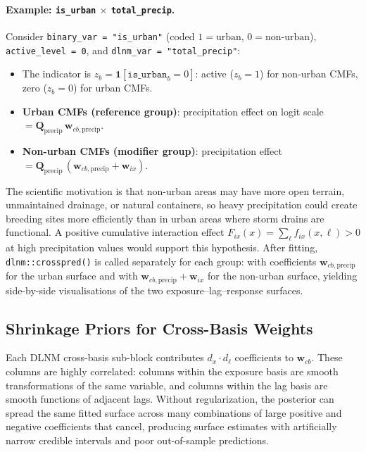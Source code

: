 \documentclass[12pt,a4paper]{article}
\begin{document}
\paragraph{Example: \texttt{is\_urban} $\times$ \texttt{total\_precip}.}
Consider \texttt{binary\_var = "is\_urban"} (coded $1 = \text{urban}$, $0 = \text{non-urban}$), \texttt{active\_level = 0}, and \texttt{dlnm\_var = "total\_precip"}:
\begin{itemize}
  \item The indicator is $z_b = \mathbf{1}[\texttt{is\_urban}_b = 0]$: active ($z_b = 1$) for non-urban CMFs, zero ($z_b = 0$) for urban CMFs.
  \item \textbf{Urban CMFs (reference group)}: precipitation effect on logit scale $= \mathbf{Q}_{\text{precip}}\,\mathbf{w}_{cb,\text{precip}}$.
  \item \textbf{Non-urban CMFs (modifier group)}: precipitation effect $= \mathbf{Q}_{\text{precip}}\,(\mathbf{w}_{cb,\text{precip}} + \mathbf{w}_{ix})$.
\end{itemize}
The scientific motivation is that non-urban areas may have more open terrain, unmaintained drainage, or natural containers, so heavy precipitation could create breeding sites more efficiently than in urban areas where storm drains are functional. A positive cumulative interaction effect $F_{ix}(x) = \sum_\ell f_{ix}(x,\ell) > 0$ at high precipitation values would support this hypothesis. After fitting, \texttt{dlnm::crosspred()} is called separately for each group: with coefficients $\mathbf{w}_{cb,\text{precip}}$ for the urban surface and with $\mathbf{w}_{cb,\text{precip}} + \mathbf{w}_{ix}$ for the non-urban surface, yielding side-by-side visualisations of the two exposure--lag--response surfaces.

\subsection{Shrinkage Priors for Cross-Basis Weights}
\label{sec:shrinkage}

Each DLNM cross-basis sub-block contributes $d_x \cdot d_\ell$ coefficients to $\mathbf{w}_{cb}$. These columns are highly correlated: columns within the exposure basis are smooth transformations of the same variable, and columns within the lag basis are smooth functions of adjacent lags. Without regularization, the posterior can spread the same fitted surface across many combinations of large positive and negative coefficients that cancel, producing surface estimates with artificially narrow credible intervals and poor out-of-sample predictions.
\end{document}
